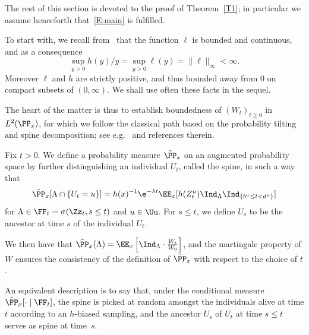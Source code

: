 The rest of this section is devoted to the proof of Theorem~\ref{T1}; in particular we assume henceforth that~\eqref{E:main} is fulfilled.



To start with, we recall from~\cite[Lemma~4.6]{BW} that the function $\ell$ is bounded and continuous, and as a consequence
\begin{equation}\label{e:bornh}
\sup_{y>0} h(y)/y = \sup_{y>0} \ell(y)=\| \ell \|_{\infty}<\infty.
\end{equation}
Moreover $\ell$ and $h$ are strictly positive, and thus bounded away from $0$ on compact subsets of $(0,\infty)$. We shall use often these facts in the sequel.



The heart of the matter is thus to establish boundedness of $(W_t)_{t\ge 0}$ in $L^2(\PP_x)$, for which we follow the classical path based on the probability tilting and spine decomposition; see e.g.~\cite{BigKyp} and references therein.

Fix $t>0$. We define a probability measure $\tilde \PP_x$ on an augmented probability space by further distinguishing an individual $U_t$, called the spine, in such a way that
\[
\tilde{\PP}_x[\Lambda \cap \{ U_t = u \}] = h(x)^{-1}\e^{-\lambda t} \EE_x[{h}(Z^u_t) \Ind_{\Lambda}\Ind_{\{b^u \leq t < d^u\}}]
\]
for $\Lambda \in \FF_t = \sigma(\Zz_t, s \le t)$ and $u\in \Uu$. For $s\le t$, we define $U_s$ to be the ancestor at time $s$ of the individual $U_t$.

We then have that $\tilde{\PP}_x(\Lambda) = \EE_x\left[\Ind_{\Lambda} \cdot \frac{W_t}{W_0} \right]$, and the martingale property of $W$ ensures the consistency of the definition of $\tilde \PP_x$ with respect to the choice of $t$.

An equivalent description is to say that, under the conditional measure $ \tilde{\PP}_x[\cdot \mid \FF_t]$, the spine is picked at random amongst the individuals alive at time $t$ according to an $h$-biased sampling, and the ancestor $U_s$ of $U_t$ at time $s\leq t$ serves as spine at time~$s$.

